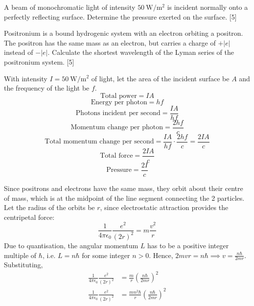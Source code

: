 \begin{problem}
    \begin{subproblem}
        A beam of monochromatic light of intensity $\qty{50}{\W\per\square\m}$ is incident normally onto a perfectly reflecting surface. Determine the pressure exerted on the surface.
    \hfill{[5]}\end{subproblem}
    \begin{subproblem}
        Positronium is a bound hydrogenic system with an electron orbiting a positron. The positron has the same mass as an electron, but carries a charge of $+|e|$ instead of $-|e| .$ Calculate the shortest wavelength of the Lyman series of the positronium system.
    \hfill{[5]}\end{subproblem}
\end{problem}

\begin{solution}
    \begin{subsolution}
        With intensity \(I=\qty{50}{\W\per\square\m}\) of light, let the area of the incident surface be $A$ and the frequency of the light be $f$.
        \[\text{Total power}=IA\]
        \[\text{Energy per photon}=hf\]
        \[\text{Photons incident per second}=\frac{IA}{hf}\]
        \[\text{Momentum change per photon}=\frac{2hf}{c}\]
        \[\text{Total momentum change per second}=\frac{IA}{hf}\cdot \frac{2hf}{c}=\frac{2IA}{c}\]
        \[\text{Total force}=\frac{2IA}{c}\]
        \[\text{Pressure}=\boxed{\frac{2I}{c}}\]
    \end{subsolution}
    \tcblower
    \begin{subsolution}
        Since positrons and electrons have the same mass, they orbit about their centre of mass, which is at the midpoint of the line segment connecting the 2 particles. Let the radius of the orbits be $r$, since electrostatic attraction provides the centripetal force:
        \[\frac{1}{4\pi\epsilon_0}\frac{e^2}{(2r)^2}=m\frac{v^2}{r}\]
        Due to quantisation, the angular momentum $L$ has to be a positive integer multiple of $\hbar$, i.e. \(L=n\hbar\) for some integer $n>0$. Hence, \(2mvr=n\hbar\implies v=\frac{n\hbar}{2mr}\). Substituting, 
        \begin{align*}
            \frac{1}{4\pi\epsilon_0}\frac{e^2}{(2r)^2}&=\frac{m}{r}\left(\frac{n\hbar}{2mr}\right)^2\\
            \frac{1}{4\pi\epsilon_0}\frac{e^2}{(2r)^2}&=\frac{mn^2\hbar}{r}\left(\frac{n\hbar}{2mr}\right)^2
        \end{align*}
    \end{subsolution}
\end{solution}

